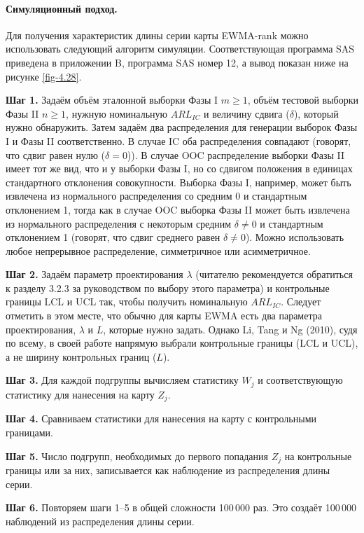 \paragraph{Симуляционный подход.} Для получения характеристик длины серии карты EWMA-rank можно использовать следующий алгоритм симуляции. Соответствующая программа SAS приведена в приложении B, программа SAS номер 12, а вывод показан ниже на рисунке \ref{fig-4.28}.

\noindent\textbf{Шаг 1.} Задаём объём эталонной выборки Фазы I \(m \ge 1\), объём тестовой выборки Фазы II \(n \ge 1\), нужную номинальную \(ARL_{IC}\) и величину сдвига (\(\delta\)), который нужно обнаружить. Затем задаём два распределения для генерации выборок Фазы I и Фазы II соответственно. В случае IC оба распределения совпадают (говорят, что сдвиг равен нулю (\(\delta = 0\))). В случае OOC распределение выборки Фазы II имеет тот же вид, что и у выборки Фазы I, но со сдвигом положения в единицах стандартного отклонения совокупности. Выборка Фазы I, например, может быть извлечена из нормального распределения со средним 0 и стандартным отклонением 1, тогда как в случае OOC выборка Фазы II может быть извлечена из нормального распределения с некоторым средним \(\delta \ne 0\) и стандартным отклонением 1 (говорят, что сдвиг среднего равен \(\delta \ne 0\)). Можно использовать любое непрерывное распределение, симметричное или асимметричное.

\noindent\textbf{Шаг 2.} Задаём параметр проектирования \(\lambda\) (читателю рекомендуется обратиться к разделу 3.2.3 за руководством по выбору этого параметра) и контрольные границы LCL и UCL так, чтобы получить номинальную \(ARL_{IC}\). Следует отметить в этом месте, что обычно для карты EWMA есть два параметра проектирования, \(\lambda\) и \(L\), которые нужно задать. Однако Li, Tang и Ng (2010), судя по всему, в своей работе напрямую выбрали контрольные границы (LCL и UCL), а не ширину контрольных границ (\(L\)).

\noindent\textbf{Шаг 3.} Для каждой подгруппы вычисляем статистику \(W_j\) и соответствующую статистику для нанесения на карту \(Z_j\).

\noindent\textbf{Шаг 4.} Сравниваем статистики для нанесения на карту с контрольными границами.

\noindent\textbf{Шаг 5.} Число подгрупп, необходимых до первого попадания \(Z_j\) на контрольные границы или за них, записывается как наблюдение из распределения длины серии.

\noindent\textbf{Шаг 6.} Повторяем шаги 1--5 в общей сложности 100\,000 раз. Это создаёт 100\,000 наблюдений из распределения длины серии.

